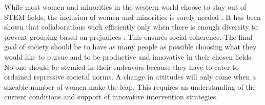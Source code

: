 \documentclass[utf8]{frontiersSCNS} %
\begin{document}
While most women and minorities in the western world choose to stay out of STEM fields, the inclusion of women and minorities is sorely needed \citep{SheNumbers, 2018Report}. It has been shown that collaborations work efficiently only when there is enough diversity to prevent grouping based on prejudices \citep{page2007making}. This ensures social coherence. %
The final goal of society should be to have as many people as possible choosing what they would like to pursue and to be productive and innovative in their chosen fields. No one should be stymied in their endeavors because they have to cater to ordained repressive societal norms. A change in attitudes will only come when a sizeable number of women make the leap. This requires an understanding of the current conditions and support of innovative intervention strategies.
\end{document}
